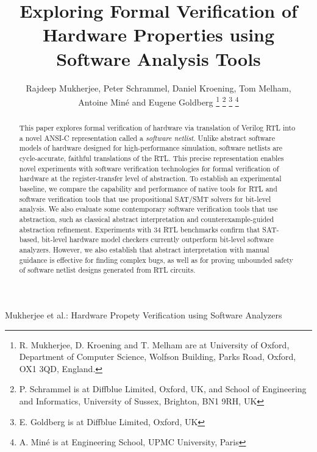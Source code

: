 \documentclass[journal]{IEEEtran}
\theoremstyle{definition}
\begin{document}
\title{Exploring Formal Verification of Hardware Properties using Software Analysis Tools}

\author{Rajdeep Mukherjee, 
        Peter Schrammel,
        Daniel Kroening, 
        Tom Melham, \\
        Antoine Min{\'e} and
        Eugene Goldberg
        \thanks{R. Mukherjee, D. Kroening and T. Melham are at 
                University of Oxford, Department of Computer Science,
                Wolfson Building, Parks Road,
                Oxford, OX1 3QD, England.}
        \thanks{P. Schrammel is at  Diffblue Limited, Oxford, UK, and
                School of Engineering and Informatics,
                University of Sussex, Brighton, BN1 9RH, UK}
        \thanks{E. Goldberg is at Diffblue Limited, Oxford, UK}
        \thanks{A. Min{\'e} is at Engineering School, UPMC University, Paris}}
%
         {Mukherjee et al.: Hardware Propety Verification using Software Analyzers}

\maketitle

\begin{abstract}
%
This paper explores formal verification of hardware via translation of
Verilog RTL into a novel ANSI-C representation called a \emph{software
netlist}.  Unlike abstract software models of hardware designed for
high-performance simulation, software netlists are cycle-accurate, faithful
translations of the RTL.  This precise representation enables novel
experiments with software verification technologies for formal verification
of hardware at the register-transfer level of abstraction.  To establish an
experimental baseline, we compare the capability and performance of native
tools for RTL and software verification tools that use propositional SAT/SMT
solvers for bit-level analysis.  We also evaluate some contemporary software
verification tools that use abstraction, such as classical abstract
interpretation and counterexample-guided abstraction refinement. 
Experiments with 34 RTL benchmarks confirm that SAT-based, bit-level
hardware model checkers currently outperform bit-level software analyzers. 
However, we also establish that abstract interpretation with manual guidance
is effective for finding complex bugs, as well as for proving unbounded safety
of software netlist designs generated from RTL circuits.
%
\end{abstract}
\end{document}
